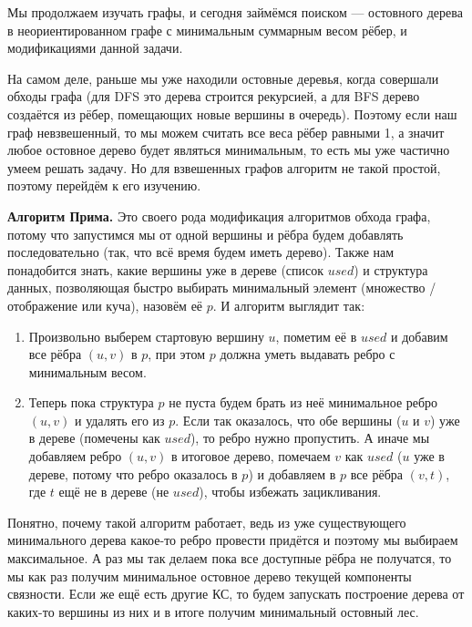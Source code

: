 Мы продолжаем изучать графы, и сегодня займёмся поиском  — остовного дерева в неориентированном графе с минимальным суммарным весом рёбер, и модификациями данной задачи.


На самом деле, раньше мы уже находили остовные деревья, когда совершали обходы графа (для DFS это дерева строится рекурсией, а для BFS дерево создаётся из рёбер, помещающих новые вершины в очередь). Поэтому если наш граф невзвешенный, то мы можем считать все веса рёбер равными 1, а значит любое остовное дерево будет являться минимальным, то есть мы уже частично умеем решать задачу. Но для взвешенных графов алгоритм не такой простой, поэтому перейдём к его изучению.

\textbf{Алгоритм Прима.} Это своего рода модификация алгоритмов обхода графа, потому что запустимся мы от одной вершины и рёбра будем добавлять последовательно (так, что всё время будем иметь дерево). Также нам понадобится знать, какие вершины уже в дереве (список $used$) и структура данных, позволяющая быстро выбирать минимальный элемент (множество / отображение или куча), назовём её $p$. И алгоритм выглядит так:

\begin{box-algo}
    \begin{enumerate}
        \item Произвольно выберем стартовую вершину $u$, пометим её в $used$ и добавим все рёбра $(u, v)$ в $p$, при этом $p$ должна уметь выдавать ребро с минимальным весом.
        \item Теперь пока структура $p$ не пуста будем брать из неё минимальное ребро $(u, v)$ и удалять его из $p$. Если так оказалось, что обе вершины ($u$ и $v$) уже в дереве (помечены как $used$), то ребро нужно пропустить. А иначе мы добавляем ребро $(u, v)$ в итоговое дерево, помечаем $v$ как $used$ ($u$ уже в дереве, потому что ребро оказалось в $p$) и добавляем в $p$ все рёбра $(v, t)$, где $t$ ещё не в дереве (не $used$), чтобы избежать зацикливания.
    \end{enumerate}
\end{box-algo}

Понятно, почему такой алгоритм работает, ведь из уже существующего минимального дерева какое-то ребро провести придётся и поэтому мы выбираем максимальное. А раз мы так делаем пока все доступные рёбра не получатся, то мы как раз получим минимальное остовное дерево текущей компоненты связности. Если же ещё есть другие КС, то будем запускать построение дерева от каких-то вершины из них и в итоге получим минимальный остовный лес.

